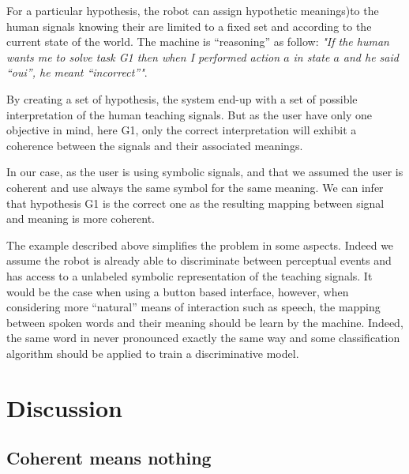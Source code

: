 
For a particular hypothesis, the robot can assign hypothetic meanings)to the human signals knowing their are limited to a fixed set and according to the current state of the world. The machine is ``reasoning'' as follow: \emph{"If the human wants me to solve task G1 then when I performed action $a$ in state $a$ and he said ``oui'', he meant ``incorrect''"}. 


By creating a set of hypothesis, the system end-up with a set of possible interpretation of the human teaching signals. But as the user have only one objective in mind, here G1, only the correct interpretation will exhibit a coherence between the signals and their associated meanings. 

In our case, as the user is using symbolic signals, and that we assumed the user is coherent and use always the same symbol for the same meaning. We can infer that hypothesis G1 is the correct one as the resulting mapping between signal and meaning is more coherent.


The example described above simplifies the problem in some aspects. Indeed we assume the robot is already able to discriminate between perceptual events and has access to a unlabeled symbolic representation of the teaching signals. It would be the case when using a button based interface, however, when considering more ``natural'' means of interaction such as speech, the mapping between spoken words and their meaning should be learn by the machine. Indeed, the same word in never pronounced exactly the same way and some classification algorithm should be applied to train a discriminative model.


\section{Discussion}
\label{chapter:limitations:discussion}

\subsection{Coherent means nothing}

